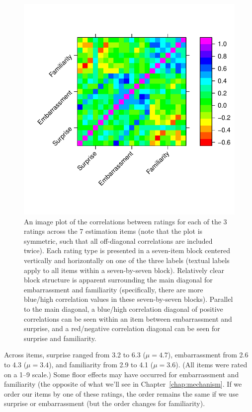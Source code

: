 \begin{figure}
    \centering
    \includegraphics{CCO-prondi-surp-corr.pdf}
    \caption{An image plot of the correlations between ratings for each of the 3
        ratings across the 7 estimation items (note that the plot is symmetric,
        such that all off-diagonal correlations are included twice). Each rating
        type is presented in a seven-item block centered vertically and
        horizontally on one of the three labels (textual labels apply to all
        items within a seven-by-seven block).  Relatively clear block structure
        is apparent surrounding the main diagonal for embarrassment and
        familiarity (specifically, there are more blue/high correlation values
        in these seven-by-seven blocks).  Parallel to the main diagonal, a
        blue/high correlation diagonal of positive correlations can be seen
        within an item between embarrassment and surprise, and a red/negative
        correlation diagonal can be seen for surprise and familiarity.}
    \label{fig:CCO-prondi-surp-corr}
\end{figure}

Across items, surprise ranged from 3.2 to 6.3 ($\mu=4.7$), embarrassment from
2.6 to 4.3 ($\mu=3.4$), and familiarity from 2.9 to 4.1 ($\mu=3.6$). (All items
were rated on a 1--9 scale.) Some floor effects may have occurred for embarrassment
and familiarity (the opposite of what we'll see in Chapter~\ref{chap:mechanism}.
If we order our items by one of these ratings, the order remains the same if we
use surprise or embarrassment (but the order changes for familiarity). 


